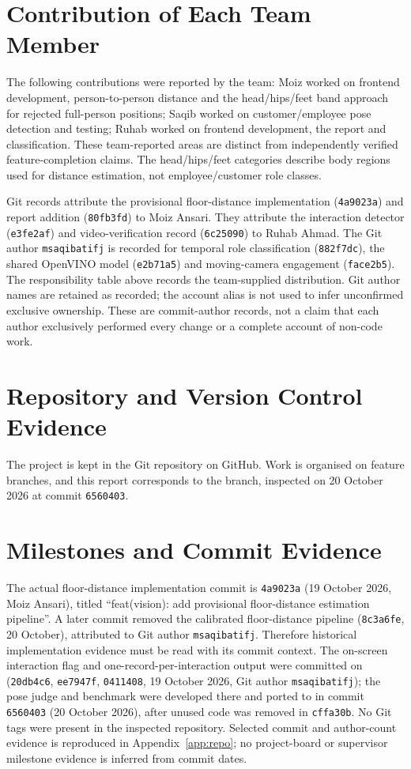 \section{Contribution of Each Team Member}
The following contributions were reported by the team: Moiz worked on frontend development, person-to-person distance and the head/hips/feet band approach for rejected full-person positions; Saqib worked on customer/employee pose detection and testing; Ruhab worked on frontend development, the report and classification. These team-reported areas are distinct from independently verified feature-completion claims. The head/hips/feet categories describe body regions used for distance estimation, not employee/customer role classes.

Git records attribute the provisional floor-distance implementation (\texttt{4a9023a}) and report addition (\texttt{80fb3fd}) to Moiz Ansari. They attribute the interaction detector (\texttt{e3fe2af}) and video-verification record (\texttt{6c25090}) to Ruhab Ahmad. The Git author \texttt{msaqibatifj} is recorded for temporal role classification (\texttt{882f7dc}), the shared OpenVINO model (\texttt{e2b71a5}) and moving-camera engagement (\texttt{face2b5}). The responsibility table above records the team-supplied distribution. Git author names are retained as recorded; the account alias is not used to infer unconfirmed exclusive ownership. These are commit-author records, not a claim that each author exclusively performed every change or a complete account of non-code work.

\section{Repository and Version Control Evidence}
The project is kept in the Git repository  on GitHub. Work is organised on feature branches, and this report corresponds to the  branch, inspected on 20 October 2026 at commit \texttt{6560403}.

\section{Milestones and Commit Evidence}
The actual floor-distance implementation commit is \texttt{4a9023a} (19 October 2026, Moiz Ansari), titled ``feat(vision): add provisional floor-distance estimation pipeline''. A later commit removed the calibrated floor-distance pipeline (\texttt{8c3a6fe}, 20 October), attributed to Git author \texttt{msaqibatifj}. Therefore historical implementation evidence must be read with its commit context. The on-screen interaction flag and one-record-per-interaction output were committed on  (\texttt{20db4c6}, \texttt{ee7947f}, \texttt{0411408}, 19 October 2026, Git author \texttt{msaqibatifj}); the pose judge and benchmark were developed there and ported to  in commit \texttt{6560403} (20 October 2026), after unused code was removed in \texttt{cffa30b}. No Git tags were present in the inspected repository. Selected commit and author-count evidence is reproduced in Appendix~\ref{app:repo}; no project-board or supervisor milestone evidence is inferred from commit dates.


